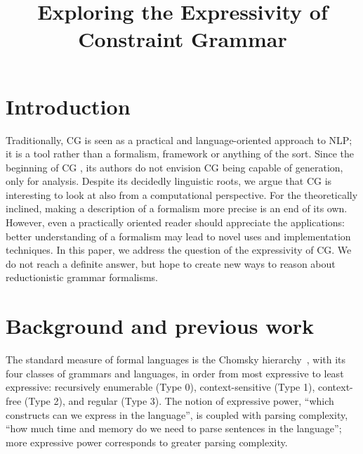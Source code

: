 \documentclass[11pt]{article}
\title{Exploring the Expressivity of Constraint Grammar}
\date{}
\begin{document}
\maketitle



\section{Introduction}

Traditionally, CG is seen as a practical and language-oriented approach to NLP; it is a tool rather than a formalism, framework or anything of the sort. Since the beginning of CG \cite{karlsson1995constraint}, its authors do not envision CG being capable of generation, only for analysis. Despite its decidedly linguistic roots, we argue that CG is interesting to look at also from a computational perspective. For the theoretically inclined, making a description of a formalism more precise is an end of its own. However, even a practically oriented reader should appreciate the applications: better understanding of a formalism may lead to novel uses and implementation techniques. In this paper, we address the question of the expressivity of CG. We do not reach a definite answer, but hope to create new ways to reason about reductionistic grammar formalisms.

\section{Background and previous work}


The standard measure of formal languages is the Chomsky hierarchy~\cite{chomsky1956hierarchy}, with its four
classes of grammars and languages, in order from most expressive to least expressive:
recursively enumerable (Type 0), context-sensitive (Type 1), context-free (Type 2), and
regular (Type 3).
The notion of expressive power, ``which constructs can we express in the language'', is coupled with parsing complexity, ``how much time and memory do we need to parse sentences in the language''; more expressive power corresponds to greater parsing complexity.
\end{document}
